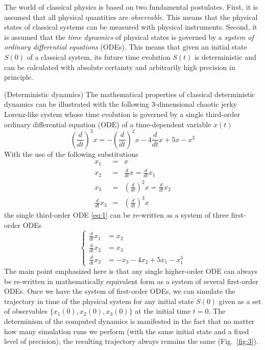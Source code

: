 \documentclass{ws-ijmpb}
\begin{document}
The world of classical physics is based on two fundamental postulates.
First, it is assumed that all physical quantities are \emph{observable}.
This means that the physical states of classical systems can be measured
with physical instruments. Second, it is assumed that the \emph{time
dynamics} of physical states is governed by a \emph{system of ordinary
differential equations} (ODEs). This means that given an initial state
$S(0)$ of a classical system, its future time evolution $S(t)$ is
deterministic and can be calculated with absolute certainty and arbitrarily
high precision in principle.
\begin{example}
(Deterministic dynamics) The mathematical properties
of classical deterministic dynamics can be illustrated with the following
3-dimensional chaotic jerky Lorenz-like system whose time evolution is governed
by a single third-order ordinary differential equation (ODE) of a
time-dependent variable $x(t)$ \cite{Sprott2009}
\begin{equation}
\left(\frac{d}{dt}\right)^{3}x=-\left(\frac{d}{dt}\right)^{2}x-4\frac{d}{dt}x+5x-x^{3}
\label{eq:1}
\end{equation}
With the use of the following substitutions
\begin{eqnarray}
x_{1} & =& x \label{eq:2}\\
x_{2} & =& \frac{d}{dt}x=\frac{d}{dt}x_{1} \label{eq:3}\\
x_{3} & =& \left(\frac{d}{dt}\right)^{2}x=\frac{d}{dt}x_{2} \label{eq:4}\\
\frac{d}{dt}x_{3} & =& \left(\frac{d}{dt}\right)^{3}x
\end{eqnarray}
the single third-order ODE \eqref{eq:1} can be re-written as a system
of three first-order ODEs 
\begin{equation}
\begin{cases}
\frac{d}{dt}x_{1} & = x_{2}\\
\frac{d}{dt}x_{2} & = x_{3}\\
\frac{d}{dt}x_{3} & = -x_{3}-4x_{2}+5x_{1}-x_{1}^{3}
\end{cases}
\end{equation}
The main point emphasized here is that any single higher-order ODE
can always be re-written in mathematically equivalent form as a system
of several first-order ODEs. Once we have the system of first-order
ODEs, we can simulate the trajectory in time of the physical system
for any initial state $S(0)$ given as a set of observables $\{x_{1}(0),x_{2}(0),x_{3}(0)\}$
at the initial time $t=0$. The determinism of the computed dynamics
is manifested in the fact that no matter how many simulation runs
we perform (with the same initial state and a fixed level of precision), the resulting trajectory always remains the same (Fig.~\ref{fig:3}).
\end{example}
\end{document}
